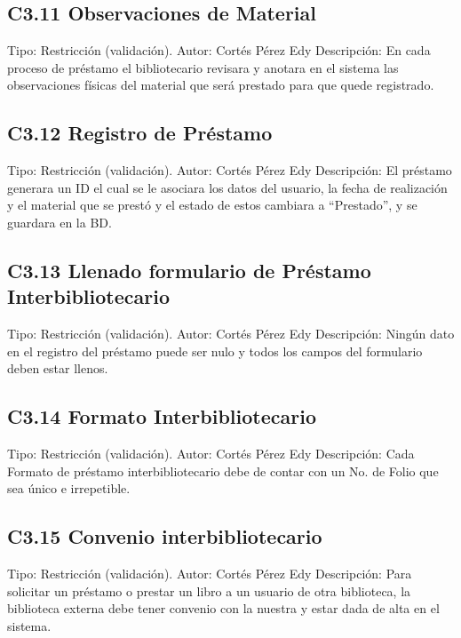 \subsection{C3.11 Observaciones de Material }
	\UCli Tipo: Restricción (validación).
	\UCli Autor: Cortés Pérez Edy
	\UCli Descripción: En cada proceso de préstamo el bibliotecario revisara y anotara en el sistema las observaciones físicas del material que será prestado para que quede registrado.
	
\subsection{C3.12 Registro de Préstamo }
	\UCli Tipo: Restricción (validación).
	\UCli Autor: Cortés Pérez Edy
	\UCli Descripción: El préstamo generara un ID el cual se le asociara los datos del usuario, la fecha de realización y el material que se prestó y el estado de estos cambiara a “Prestado”, y se guardara en la BD.
	
\subsection{C3.13 Llenado formulario de Préstamo Interbibliotecario }
	\UCli Tipo: Restricción (validación).
	\UCli Autor: Cortés Pérez Edy
	\UCli Descripción: Ningún dato en el registro del préstamo puede ser nulo y todos los campos del formulario deben estar llenos.
	
\subsection{C3.14 Formato Interbibliotecario }
	\UCli Tipo: Restricción (validación).
	\UCli Autor: Cortés Pérez Edy
	\UCli Descripción: Cada Formato de préstamo interbibliotecario debe de contar con un No. de Folio que sea único e irrepetible.
	
\subsection{C3.15 Convenio interbibliotecario }
	\UCli Tipo: Restricción (validación).
	\UCli Autor: Cortés Pérez Edy
	\UCli Descripción: Para solicitar un préstamo o prestar un libro a un usuario de otra biblioteca, la biblioteca externa debe tener convenio con la nuestra y estar dada de alta en el sistema. 

